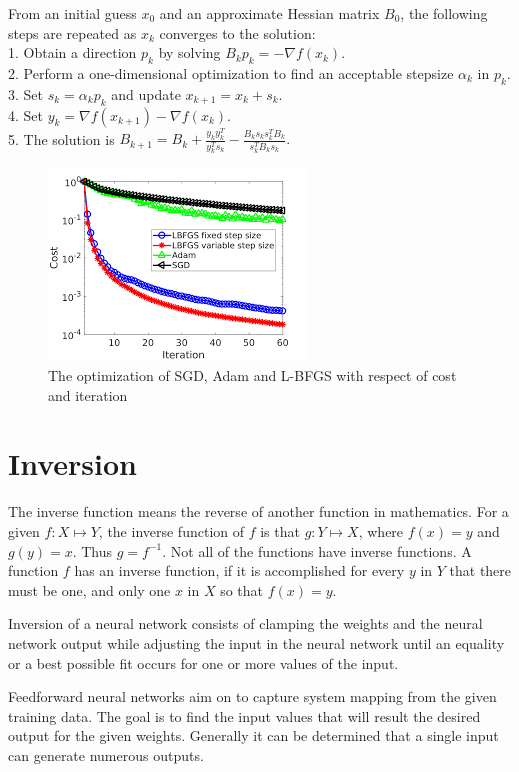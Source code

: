 \noindent From an initial guess $x_0$ and an approximate Hessian matrix $B_0$, the following steps are repeated as $x_k$ converges to the solution:\\
1. Obtain a direction $p_k$ by solving $B_k p_k = - \nabla f(x_k). $ \\
2. Perform a one-dimensional optimization to find an acceptable stepsize $\alpha_k$ in $p_k$. \\
3. Set $s_k = \alpha_k p_k$ and update $x_{k+1} = x_k + s_k.$ \\
4. Set $y_k = \nabla f(x_{k+1}) - \nabla f(x_k).$ \\ 
5. The solution is $B_{k+1} = B_k + \frac{y_k y^T_k}{y^T_k s_k} - \frac{B_k s_k s^T_k B_k}{s^T_k B_k s_k}.$

\begin{figure}[h]
	\centering
	\includegraphics[height=0.34\linewidth]{./figures/optimization}
	\caption{The optimization of SGD, Adam and L-BFGS with respect of cost and iteration}
	\label{fig:optimization}
\end{figure}



\section{Inversion}

The inverse function means the reverse of another function in mathematics. For a given $f: X \mapsto Y$, the inverse function of $f$ is that $g: Y \mapsto X$, where $f(x) = y$ and $g(y) = x$. Thus $g = f^{-1}$. Not all of the functions have inverse functions. A function $f$ has an inverse function, if it is accomplished for every $y$ in $Y$ that there must be one, and only one $x$ in $X$ so that $f(x) = y$.\medskip

Inversion of a neural network consists of clamping the weights and the neural network output while adjusting the input in the neural network until an equality or a best possible fit occurs for one or more values of the input. \medskip

Feedforward neural networks aim on to capture system mapping from the given training data. The goal is to find the input values that will result the desired output for the given weights. Generally it can be determined that a single input can generate numerous outputs. 

